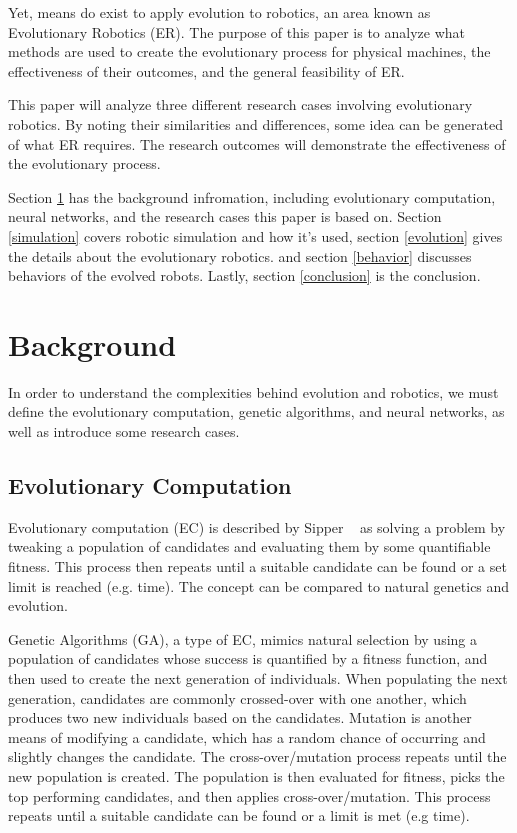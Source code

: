 \documentclass{sig-alternate}
\begin{document}
 Yet, means do exist to apply evolution to robotics, an area known as Evolutionary Robotics (ER). The purpose of this paper is to analyze what methods are used to create the evolutionary process for physical machines, the effectiveness of their outcomes, and the general feasibility of ER.
 
 This paper will analyze three different research cases involving evolutionary robotics. By noting their similarities and differences, some idea can be generated of what ER requires. The research outcomes will demonstrate the effectiveness of the evolutionary process.

   Section \ref{background}  has the background infromation, including evolutionary computation, neural networks, and the research cases this paper is based on. Section \ref{simulation} covers robotic simulation and how it's used, section \ref{evolution} gives the details about the evolutionary robotics. and section \ref{behavior} discusses behaviors of the evolved robots. Lastly, section \ref{conclusion} is the conclusion.
 
 
\section{Background}\label{background}
In order to understand the complexities behind evolution and robotics, we must define the evolutionary computation, genetic algorithms,  and neural networks, as well as introduce some research cases.

 \subsection{Evolutionary Computation}\label{background EC}
  Evolutionary computation (EC) is described by Sipper ~\cite{Sipper2011Win} as solving a problem by tweaking a population of candidates and evaluating them by some quantifiable fitness. This process then repeats until a suitable candidate can be found or a set limit is reached (e.g. time). The concept can be compared to natural genetics and evolution.
  
  Genetic Algorithms (GA), a type of EC, mimics natural selection by using a population of candidates whose success is quantified by a fitness function, and then used to create the next generation of individuals. When populating the next generation, candidates are commonly crossed-over with one another, which produces two new individuals based on the candidates. Mutation is another means of modifying a candidate, which has a random chance of occurring and slightly changes the candidate. The cross-over/mutation process repeats until the new population is created. The population is then evaluated for fitness, picks the top performing candidates, and then applies cross-over/mutation. This process  repeats until a suitable candidate can be found or a limit is met (e.g time).
  
\end{document}
